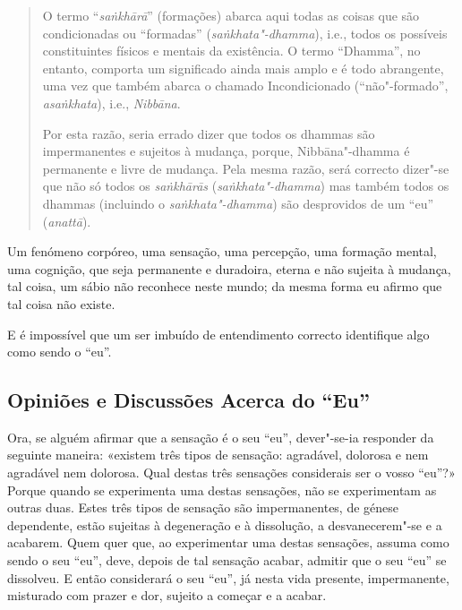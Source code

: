 
\begin{quote}
  O termo “\emph{sa\.{n}khārā}” (formações) abarca aqui todas as coisas que são
  condicionadas ou “formadas” (\emph{sa\.{n}khata"-dhamma}), i.e., todos os
  possíveis constituintes físicos e mentais da existência. O termo “Dhamma”,
  no entanto, comporta um significado ainda mais amplo e é todo abrangente, uma
  vez que também abarca o chamado Incondicionado (“não"-formado”,
  \emph{asa\.{n}khata}), i.e., \emph{Nibbāna}.

  Por esta razão, seria errado dizer que todos os dhammas são impermanentes e
  sujeitos à mudança, porque, Nibbāna"-dhamma é permanente e livre de mudança.
  Pela mesma razão, será correcto dizer"-se que não só todos os
  \emph{sa\.{n}khārās} (\emph{sa\.{n}khata"-dhamma}) mas também todos os dhammas
  (incluindo o \emph{sa\.{n}khata"-dhamma}) são desprovidos de um “eu”
  (\emph{anattā}).
\end{quote}

\bigskip

Um fenómeno corpóreo, uma sensação, uma percepção, uma formação mental, uma
cognição, que seja permanente e duradoira, eterna e não sujeita à mudança, tal
coisa, um sábio não reconhece neste mundo; da mesma forma eu afirmo que tal
coisa não existe.


E é impossível que um ser imbuído de entendimento correcto identifique algo como
sendo o “eu”.


\subsection{Opiniões e Discussões Acerca do “Eu”}

Ora, se alguém afirmar que a sensação é o seu “eu”, dever"-se-ia responder da
seguinte maneira: «existem três tipos de sensação: agradável, dolorosa e nem
agradável nem dolorosa. Qual destas três sensações considerais ser o vosso
“eu”?» Porque quando se experimenta uma destas sensações, não se experimentam
as outras duas. Estes três tipos de sensação são impermanentes, de génese
dependente, estão sujeitas à degeneração e à dissolução, a desvanecerem"-se e a
acabarem. Quem quer que, ao experimentar uma destas sensações, assuma como sendo
o seu “eu”, deve, depois de tal sensação acabar, admitir que o seu “eu” se
dissolveu. E então considerará o seu “eu”, já nesta vida presente,
impermanente, misturado com prazer e dor, sujeito a começar e a acabar.

